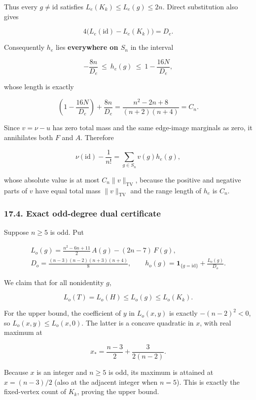 \documentclass[
  11pt,
]{article}
\begin{document}
Thus every \(g\ne\mathrm{id}\) satisfies \(L_e(K_k)\le L_e(g)\le2n\).
Direct substitution also gives

\[
4\big(L_e(\mathrm{id})-L_e(K_k)\big)=D_e. \tag{79}
\]

Consequently \(h_e\) lies \textbf{everywhere on \(S_n\)} in the interval

\[
-\frac{8n}{D_e}
\ \le\ h_e(g)\ \le\
1-\frac{16N}{D_e},
\]

whose length is exactly

\[
\left(1-\frac{16N}{D_e}\right)+\frac{8n}{D_e}
=\frac{n^2-2n+8}{(n+2)(n+4)}=C_n. \tag{80}
\]

Since \(v=\nu-u\) has zero total mass and the same edge-image marginals
as zero, it annihilates both \(F\) and \(A\). Therefore

\[
\nu(\mathrm{id})-\frac1{n!}
=\sum_{g\in S_n}v(g)h_e(g),
\]

whose absolute value is at most \(C_n\|v\|_{\mathrm{TV}}\), because the
positive and negative parts of \(v\) have equal total mass
\(\|v\|_{\mathrm{TV}}\) and the range length of \(h_e\) is \(C_n\).

\subsubsection{17.4. Exact odd-degree dual
certificate}\label{exact-odd-degree-dual-certificate}

Suppose \(n\ge5\) is odd. Put

\[
\begin{gathered}
L_o(g)=\frac{n^2-6n+11}{2}\,A(g)-(2n-7)\,F(g),\\
D_o=\frac{(n-3)(n-2)(n+3)(n+4)}8,\qquad
h_o(g)=\mathbf1_{\{g=\mathrm{id}\}}+\frac{L_o(g)}{D_o}.
\end{gathered}\tag{81}
\]

We claim that for all nonidentity \(g\),

\[
L_o(T)=L_o(H)\le L_o(g)\le L_o(K_k). \tag{82}
\]

For the upper bound, the coefficient of \(y\) in \(L_o(x,y)\) is exactly
\(-(n-2)^2<0\), so \(L_o(x,y)\le L_o(x,0)\). The latter is a concave
quadratic in \(x\), with real maximum at

\[
x_*=\frac{n-3}{2}+\frac{3}{2(n-2)}.
\]

Because \(x\) is an integer and \(n\ge5\) is odd, its maximum is
attained at \(x=(n-3)/2\) (also at the adjacent integer when \(n=5\)).
This is exactly the fixed-vertex count of \(K_k\), proving the upper
bound.
\end{document}

